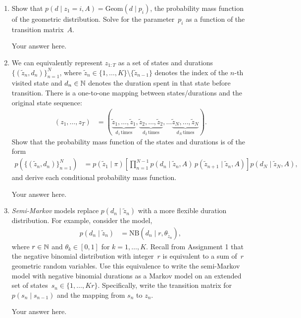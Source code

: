 \documentclass[11pt]{article}
\begin{document}
\begin{enumerate}[label=(\alph*)]
    \item Show that $p(d \mid z_1=i, A) = \mathrm{Geom}(d \mid p_i)$, the probability mass function of the geometric distribution.  Solve for the parameter~$p_i$ as a function of the transition matrix~$A$.
    
    \begin{solution}
    Your answer here.
    \end{solution}
    
    \item We can equivalently represent $z_{1:T}$ as a set of states and durations~$\{(\tilde{z}_n, d_n)\}_{n=1}^N$, where $\tilde{z}_n \in \{1, \ldots, K\} \setminus \{\tilde{z}_{n-1}\}$ denotes the index of the $n$-th visited state and $d_n \in \mathbb{N}$ denotes the duration spent in that state before transition.  There is a one-to-one mapping between states/durations and the original state sequence:
    \begin{align*}
        (z_1, \ldots, z_T) &= (\underbrace{\tilde{z}_1, \ldots, \tilde{z}_1}_{d_1\,\mathrm{times}}, \underbrace{\tilde{z}_2, \ldots, \tilde{z}_2}_{d_2\,\mathrm{times}}, \ldots \underbrace{\tilde{z}_N, \ldots, \tilde{z}_N}_{d_N\,\mathrm{times}}).
    \end{align*}
    Show that the probability mass function of the states and durations is of the form
    \begin{align*}
        p(\{(\tilde{z}_n, d_n)\}_{n=1}^N) &= p(\tilde{z}_1 \mid \pi) \left[ \prod_{n=1}^{N-1} p(d_n \mid \tilde{z}_n, A) \, p(\tilde{z}_{n+1} \mid \tilde{z}_n, A) \right] p(d_N \mid \tilde{z}_N, A),
    \end{align*}
    and derive each conditional probability mass function.
    
    \begin{solution}
    Your answer here.
    \end{solution}
    
    \item \emph{Semi-Markov} models replace $p(d_n \mid \tilde{z}_n)$ with a more flexible duration distribution.  For example, consider the model,
    \begin{align*}
        p(d_n \mid \tilde{z}_n) &= \mathrm{NB}(d_n \mid r, \theta_{\tilde{z}_n}),
    \end{align*}
    where $r \in \mathbb{N}$ and $\theta_k \in [0, 1]$ for $k=1,\ldots,K$.  Recall from Assignment 1 that the negative binomial distribution with integer~$r$ is equivalent to a sum of~$r$ geometric random variables.  Use this equivalence to write the semi-Markov model with negative binomial durations as a Markov model on an extended set of states~$s_n \in \{1, \ldots, Kr\}$.  Specifically, write the transition matrix for $p(s_n \mid s_{n-1})$ and the mapping from $s_n$ to $z_n$.
    
    \begin{solution}
    Your answer here.
    \end{solution}
    
\end{enumerate}
\end{document}
